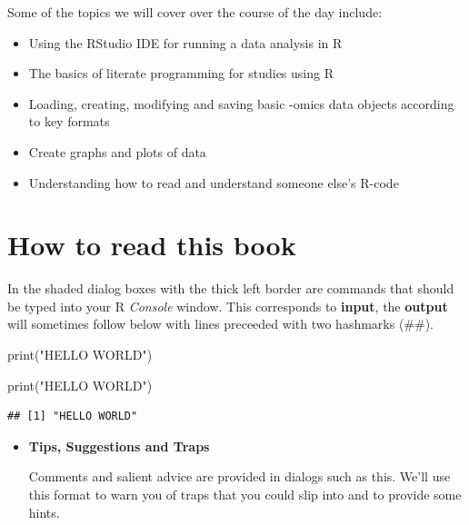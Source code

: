\documentclass[a4paper]{book}
\newenvironment{Shaded}{}{}
\newcommand{\KeywordTok}[1]{\textcolor[rgb]{0.00,0.00,1.00}{{#1}}}
\newcommand{\StringTok}[1]{\textcolor[rgb]{0.00,0.50,0.50}{{#1}}}
\newcommand{\NormalTok}[1]{{#1}}
\providecommand{\tightlist}{%
  \setlength{\itemsep}{0pt}\setlength{\parskip}{0pt}}
\newlength{\leftbarwidth}
\newlength{\leftbarsep}
\newcommand*{\leftbarcolorcmd}{\color{darkgray}}%
\renewenvironment{leftbar}{%
    \def\FrameCommand{{\leftbarcolorcmd{\vrule width \leftbarwidth\relax\hspace {\leftbarsep}}}}%
    \MakeFramed {\advance \hsize -\width \FrameRestore }%
}{%
    \endMakeFramed
}
\renewenvironment{Shaded}
{\vspace{0em}\begin{leftbar}\begin{snugshade}}
{\end{snugshade}\end{leftbar}\vspace{0pt}}
\newenvironment{rmdblock}[1]
  {\vspace{1.5em}\begin{shaded*}
  \begin{itemize}
  \renewcommand{\labelitemi}{
    \raisebox{-.7\height}[0pt][0pt]{
      {\setkeys{Gin}{width=3em,keepaspectratio}\texttt{[image: images/\#1]}}
    }
  }
  \item
  }
  {
  \end{itemize}
  \end{shaded*}
  }
\newenvironment{rmdtip}
  {\begin{rmdblock}{tip}}
  {\end{rmdblock}}
\begin{document}
Some of the topics we will cover over the course of the day include:

\begin{itemize}
\tightlist
\item
  Using the RStudio IDE for running a data analysis in R
\item
  The basics of literate programming for studies using R
\item
  Loading, creating, modifying and saving basic -omics data objects
  according to key formats
\item
  Create graphs and plots of data
\item
  Understanding how to read and understand someone else's R-code
\end{itemize}

\section{How to read this book}\label{how-to-read-this-book}

In the shaded dialog boxes with the thick left border are commands that
should be typed into your R \emph{Console} window. This corresponds to
\textbf{input}, the \textbf{output} will sometimes follow below with
lines preceeded with two hashmarks (\#\#).

\hypertarget{numCode}{\label{numCode}}
\begin{Shaded}
\begin{Highlighting}[numbers=left,,]
\KeywordTok{print}\NormalTok{(}\StringTok{"HELLO WORLD"}\NormalTok{)}
\end{Highlighting}
\end{Shaded}

\begin{Shaded}
\begin{Highlighting}[]
\KeywordTok{print}\NormalTok{(}\StringTok{"HELLO WORLD"}\NormalTok{)}
\end{Highlighting}
\end{Shaded}

\begin{verbatim}
## [1] "HELLO WORLD"
\end{verbatim}

\begin{rmdtip}
\textbf{Tips, Suggestions and Traps}

Comments and salient advice are provided in dialogs such as this. We'll
use this format to warn you of traps that you could slip into and to
provide some hints.
\end{rmdtip}
\end{document}
